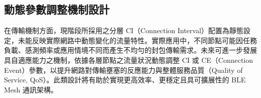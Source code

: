 \begin{ZhChapter}
\subsection{動態參數調整機制設計}
在傳輸機制方面，現階段所採用之分層 CI（Connection Interval）配置為靜態設定，未能反映實際網路中動態變化的流量特性。實際應用中，不同節點可能因任務負載、感測頻率或應用情境不同而產生不均勻的封包傳輸需求。未來可進一步發展具自適應能力之機制，依據各層節點之流量狀況動態調整 CI 或 CE（Connection Event）參數，以提升網路對傳輸壅塞的反應能力與整體服務品質（Quality of Service, QoS）。此類設計將有助於實現更高效率、更穩定且具可擴展性的 BLE Mesh 通訊架構。


\end{ZhChapter}